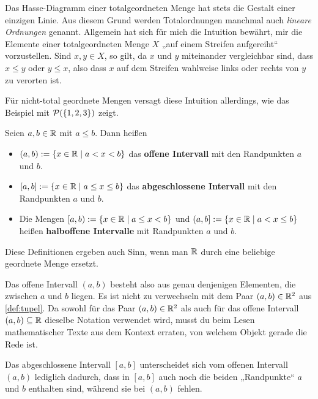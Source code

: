\begin{bem}
    Das Hasse-Diagramm einer totalgeordneten Menge hat stets die Gestalt einer einzigen Linie. Aus diesem Grund werden Totalordnungen manchmal auch \emph{lineare Ordnungen} genannt. Allgemein hat sich für mich die Intuition bewährt, mir die Elemente einer totalgeordneten Menge $X$ „auf einem Streifen aufgereiht“ vorzustellen. Sind $x,y\in X$, so gilt, da $x$ und $y$ miteinander vergleichbar sind, dass $x\le y$ oder $y\le x$, also dass $x$ auf dem Streifen wahlweise links oder rechts von $y$ zu verorten ist.

    Für nicht-total geordnete Mengen versagt diese Intuition allerdings, wie das Beispiel mit $\mathcal P(\{1,2,3\})$ zeigt.
\end{bem}


\begin{defin}[Intervalle in $\R$] \label{def:intervall} 
    Seien $a,b\in \mathbb R$ mit $a\le b$. Dann heißen
    \begin{itemize}
        \item $(a,b) := \{ x\in \mathbb R \mid a<x<b \}$ das \textbf{offene Intervall} mit den Randpunkten $a$ und $b$. 
        \item $[a,b] := \{ x\in \mathbb R \mid a\le x\le b \}$ das \textbf{abgeschlossene Intervall} mit den Randpunkten $a$ und $b$.
        \item Die Mengen $[a,b) := \{ x\in \mathbb R \mid a\le x<b \}$ und $(a,b] := \{ x\in \mathbb R \mid a<x\le b \}$ heißen \textbf{halboffene Intervalle} mit Randpunkten $a$ und $b$. 
    \end{itemize}
    Diese Definitionen ergeben auch Sinn, wenn man $\R$ durch eine beliebige geordnete Menge ersetzt.
\end{defin}


\begin{bem}
    Das offene Intervall $(a,b)$ besteht also aus genau denjenigen Elementen, die zwischen $a$ und $b$ liegen. Es ist nicht zu verwechseln mit dem Paar $(a,b)\in \mathbb R^2$ aus \cref{def:tupel}. Da sowohl für das Paar $(a,b)\in \mathbb R^2$ als auch für das offene Intervall $(a,b)\subseteq \mathbb R$ dieselbe Notation verwendet wird, musst du beim Lesen mathematischer Texte aus dem Kontext erraten, von welchem Objekt gerade die Rede ist.
    
    Das abgeschlossene Intervall $[a,b]$ unterscheidet sich vom offenen Intervall $(a,b)$ lediglich dadurch, dass in $[a,b]$ auch noch die beiden „Randpunkte“ $a$ und $b$ enthalten sind, während sie bei $(a,b)$ fehlen.
\end{bem}


